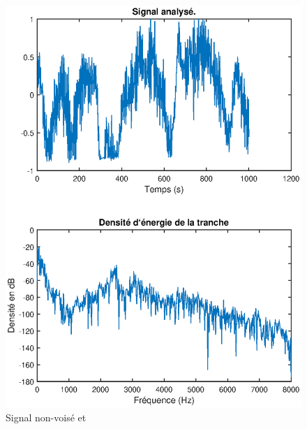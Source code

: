 \documentclass[french]{article}
\begin{document}
\begin{figure}[h!]
\begin{minipage}{0.45\textwidth}
	\includegraphics[width=\textwidth]{images/tfd_nonvoise.eps}
	\caption{Signal non-voisé et }
	\label{fig:dse_nonvois}
	\end{minipage}
\end{figure}



\FloatBarrier
\end{document}
